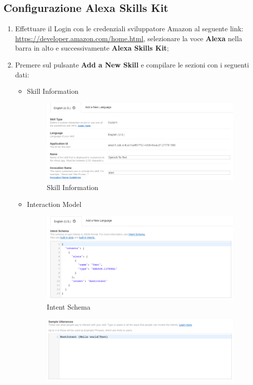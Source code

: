 \documentclass[../ManualeSviluppatore_v1.0.0.tex]{subfiles}
\begin{document}
	\subsection{Configurazione Alexa Skills Kit}
		\begin{enumerate}
			\item Effettuare il Login con le credenziali sviluppatore Amazon al seguente link: \url{https://developer.amazon.com/home.html}, selezionare la voce \textbf{Alexa} nella barra in alto e successivamente \textbf{Alexa Skills Kit};
			\item Premere sul pulsante \textbf{Add a New Skill} e compilare le sezioni con i seguenti dati:
				\begin{itemize}
				\item Skill Information
					\begin{figure}[!h]
						\centering
						\includegraphics[width=\textwidth]{Screenshot/ASK/SkillInformation.png}
						\caption{Skill Information}
					\end{figure}
				\item Interaction Model
					\begin{figure}[!h]
						\centering
						\includegraphics[width=\textwidth]{Screenshot/ASK/InteractionModel1.png}
						\caption{Intent Schema}
					\end{figure}
					\begin{figure}[!h]
						\centering
						\includegraphics[width=\textwidth]{Screenshot/ASK/InteractionModel2.png}

\end{figure}
\end{itemize}
\end{enumerate}
\end{document}
